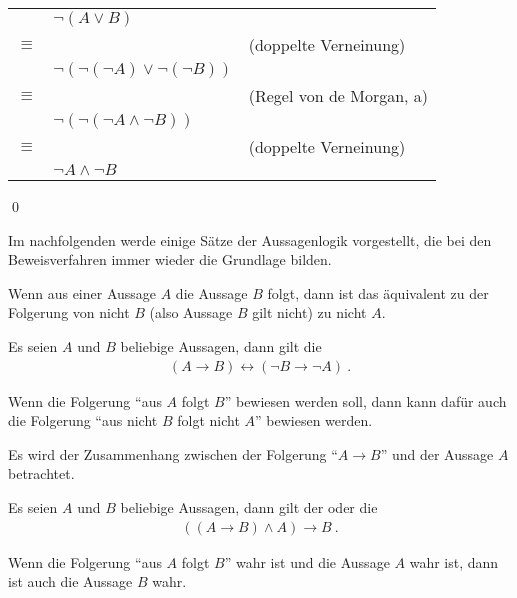 \begin{Unit}
\begin{tabular}{cll}
  & $\neg(A \lor B)$ & \\
  $\equiv$ & & (doppelte Verneinung) \\
  & $\neg(\neg(\neg A) \lor \neg(\neg B))$ & \\
  $\equiv$ & & (Regel von de Morgan, a) \\
  & $\neg(\neg(\neg A \land \neg B))$ & \\
  $\equiv$ & & (doppelte Verneinung) \\
  & $\neg A \land \neg B$ & \\
\end{tabular}

\qed
\end{Unit}

\begin{Unit}
Im nachfolgenden werde einige Sätze der Aussagenlogik vorgestellt, die bei 
den Beweisverfahren immer wieder die Grundlage bilden.
\end{Unit}

\begin{Unit}[Kontraposition]
Wenn aus einer Aussage $A$ die Aussage $B$ folgt, dann ist das äquivalent zu
der Folgerung von nicht $B$ (also Aussage $B$ gilt nicht) zu nicht $A$.

\begin{Satz} Es seien $A$ und $B$ beliebige Aussagen, dann gilt die
\begin{align}
  (A \rightarrow B) \leftrightarrow (\neg B \rightarrow \neg A) \ .
\end{align}
\end{Satz}

Wenn die Folgerung \enquote{aus $A$ folgt $B$} bewiesen werden soll, dann 
kann dafür auch die Folgerung \enquote{aus nicht $B$ folgt nicht $A$} 
bewiesen werden.
\end{Unit}

\begin{Unit}
Es wird der Zusammenhang zwischen der Folgerung \enquote{$A \rightarrow B$} 
und der Aussage $A$ betrachtet.

\begin{Satz} Es seien $A$ und $B$ beliebige Aussagen, dann gilt der 
 oder die 
\begin{align}
  ((A \rightarrow B) \land A) \rightarrow B \ .
\end{align}
\end{Satz}

Wenn die Folgerung \enquote{aus $A$ folgt $B$} wahr ist und die Aussage $A$ 
wahr ist, dann ist auch die Aussage $B$ wahr.
\end{Unit}

